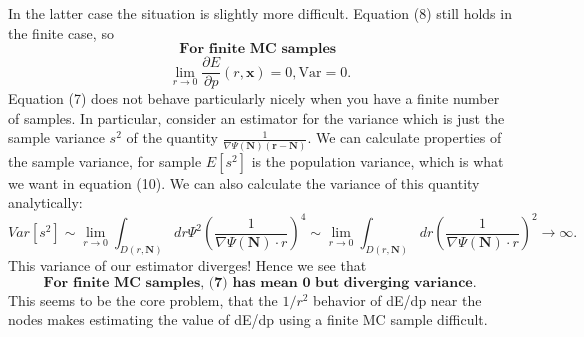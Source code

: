 \documentclass{article}
\begin{document}
In the latter case the situation is slightly more difficult. Equation (8) still holds in the finite case, so 
$$\textbf{For\ } \textbf{finite\ } \textbf{MC } \textbf{samples }$$
\begin{equation}
\boxed{\lim_{r \rightarrow 0} \frac{\partial E}{\partial p}(r,\textbf{x}) = 0, \text{Var} = 0.}
\end{equation}
Equation (7) does not behave particularly nicely when you have a finite number of samples. In particular, consider an estimator for the variance which is just the sample variance $s^2$ of the quantity $\frac{1}{\nabla \Psi(\textbf{N})(\textbf{r}-\textbf{N})}$. We can calculate properties of the sample variance, for sample $E[s^2]$ is the population variance, which is what we want in equation (10). We can also calculate the variance of this quantity analytically:
\begin{equation}
\boxed{Var[s^2] \sim \lim_{r\rightarrow 0} \int_{D(r,\textbf{N})} dr \Psi^2 (\frac{1}{\nabla\Psi(\textbf{N})\cdot r})^4 \sim \lim_{r\rightarrow 0} \int_{D(r,\textbf{N})} dr (\frac{1}{\nabla\Psi(\textbf{N})\cdot r})^2 \rightarrow \infty.}
\end{equation}
This variance of our estimator diverges!
Hence we see that 
$$\textbf{For finite MC samples, (7) has mean 0 but diverging variance.}$$
This seems to be the core problem, that the $1/r^2$ behavior of dE/dp near the nodes makes estimating the value of dE/dp using a finite MC sample difficult.
\end{document}
